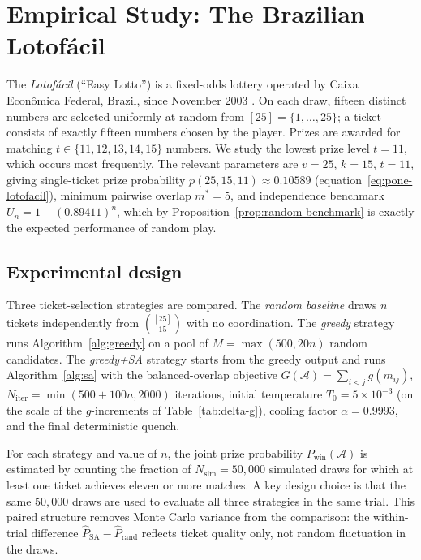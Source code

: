
\section{Empirical Study: The Brazilian Lotof\'{a}cil}
\label{sec:empirical}

The \emph{Lotof\'{a}cil} (``Easy Lotto'') is a fixed-odds lottery operated
by Caixa Econ\^{o}mica Federal, Brazil, since November 2003
\citep{CEF2024}.  On each draw,
fifteen distinct numbers are selected uniformly at random from
$[25] = \{1,\ldots,25\}$; a ticket consists of exactly fifteen numbers
chosen by the player.  Prizes are awarded for matching $t \in \{11,12,13,
14,15\}$ numbers.  We study the lowest prize level $t = 11$, which occurs
most frequently.  The relevant parameters are $v=25$, $k=15$, $t=11$,
giving single-ticket prize probability $p(25,15,11) \approx 0.10589$
(equation~\eqref{eq:pone-lotofacil}), minimum pairwise overlap $m^* = 5$,
and independence benchmark $U_n = 1-(0.89411)^n$, which by
Proposition~\ref{prop:random-benchmark} is exactly the expected performance
of random play.

\subsection{Experimental design}
\label{sec:exp-design}

Three ticket-selection strategies are compared.  The \emph{random baseline}
draws $n$ tickets independently from $\binom{[25]}{15}$ with no coordination.
The \emph{greedy} strategy runs Algorithm~\ref{alg:greedy} on a pool of
$M = \max(500, 20n)$ random candidates.  The \emph{greedy+SA} strategy
starts from the greedy output and runs Algorithm~\ref{alg:sa} with the
balanced-overlap objective $G(\mathcal{A}) = \sum_{i<j} g(m_{ij})$,
$N_{\mathrm{iter}} = \min(500 + 100n, 2000)$ iterations, initial temperature
$T_0 = 5 \times 10^{-3}$ (on the scale of the $g$-increments of
Table~\ref{tab:delta-g}), cooling factor $\alpha = 0.9993$, and the final
deterministic quench.

For each strategy and value of $n$, the joint prize probability
$P_{\mathrm{win}}(\mathcal{A})$ is estimated by counting the fraction of
$N_{\mathrm{sim}} = 50{,}000$ simulated draws for which at least one ticket
achieves eleven or more matches.  A key design choice is that the same
$50{,}000$ draws are used to evaluate all three strategies in the same trial.
This paired structure removes Monte Carlo variance from the comparison:
the within-trial difference $\hat{P}_{\mathrm{SA}} - \hat{P}_{\mathrm{rand}}$
reflects ticket quality only, not random fluctuation in the draws.

